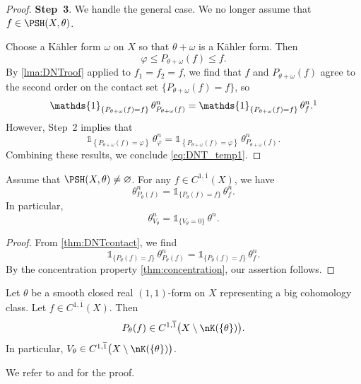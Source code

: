 \begin{proof}
\textbf{Step~3}. We handle the general case. We no longer assume that $f\in \PSH(X,\theta)$.

Choose a Kähler form $\omega$ on $X$ so that $\theta+\omega$ is a Kähler form. Then
\[
\varphi\leq P_{\theta+\omega}(f)\leq f.
\]
By \cref{lma:DNTroof} applied to $f_1=f_2=f$, we find that $f$ and $P_{\theta+\omega}(f)$ agree to the second order on the contact set $\{ P_{\theta+\omega}(f)=f \}$, so
\[
\mathds{1}_{\left\{ P_{\theta+\omega}(f)=f \right\}}\,\theta_{P_{\theta+\omega}(f)}^n=\mathds{1}_{\left\{ P_{\theta+\omega}(f)=f \right\}}\,\theta_{f}^n.\footnotemark
\]
However, Step~2 implies that
\[
\mathds{1}_{\left\{ P_{\theta+\omega}(f)=\varphi \right\}}\,\theta_{\varphi}^n=\mathds{1}_{\left\{ P_{\theta+\omega}(f)=\varphi \right\}}\,\theta_{P_{\theta+\omega}(f)}^n.
\]
Combining these results, we conclude \eqref{eq:DNT_temp1}.
\end{proof}

\begin{corollary}\label{cor:DNTenvelope1}
    Assume that $\PSH(X,\theta)\neq \varnothing$. For any $f\in C^{1,\overline{1}}(X)$, we have
    \[
    \theta^n_{P_\theta(f)} = \mathds{1}_{\{P_\theta(f)=f\}}\,\theta^n_f.
    \]
    In particular,
    \[
        \theta_{V_{\theta}}^n=\mathds{1}_{\{V_{\theta}=0\}}\,\theta^n.
    \]
\end{corollary}
\begin{proof}
    From \cref{thm:DNTcontact}, we find
    \[
    \mathds{1}_{\{P_\theta(f)=f\}}\,\theta^n_{P_\theta(f)}=\mathds{1}_{\{P_\theta(f)=f\}}\,\theta^n_f.
    \]
    By the concentration property \cref{thm:concentration}, our assertion follows.
\end{proof}




\begin{theorem}\label{thm:DNT23_C11bar}
Let $\theta$ be a smooth closed real $(1,1)$-form on $X$ representing a big cohomology class. Let $f\in C^{1,\overline{1}}(X)$. Then
\[
P_\theta(f)\in C^{1,\overline{1}}\bigl(X\setminus\nK(\{\theta\})\bigr).
\]
In particular, $V_{\theta}\in C^{1,\overline{1}}\bigl(X\setminus\nK(\{\theta\})\bigr)$.
\end{theorem}

We refer to \cite{DNT23} and \cite[Theorem~16.2.29]{FPT} for the proof.



%
